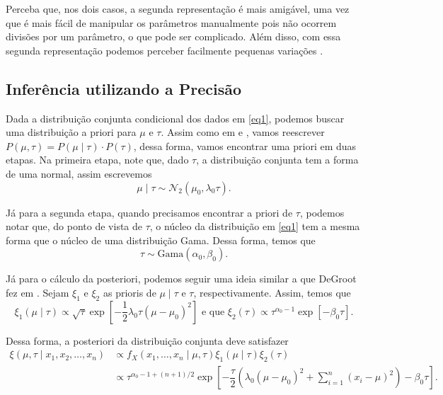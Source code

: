 \documentclass{article}
\begin{document}
Perceba que, nos dois casos, a segunda representação é mais amigável, uma vez que é mais fácil de manipular os parâmetros manualmente pois não ocorrem divisões por um parâmetro, o que pode ser complicado. Além disso, com essa segunda representação podemos perceber facilmente pequenas variações \cite{stackexchange}.

\subsection*{Inferência utilizando a Precisão}

Dada a distribuição conjunta condicional dos dados em \ref{eq1}, podemos buscar uma distribuição a priori para $\mu$ e $\tau$. Assim como em \cite{ehlers} e \cite{ehlers2}, vamos reescrever $P(\mu, \tau) = P(\mu \mid \tau)\cdot P(\tau)$, dessa forma, vamos encontrar uma priori em duas etapas. Na primeira etapa, note que, dado $\tau$, a distribuição conjunta tem a forma de uma normal, assim escrevemos
\[\mu \mid \tau \sim \mathcal{N}_2(\mu_0, \lambda_0 \tau).\]

Já para a segunda etapa, quando precisamos encontrar a priori de $\tau$, podemos notar que, do ponto de vista de $\tau$, o núcleo da distribuição em \ref{eq1} tem a mesma forma que o núcleo de uma distribuição Gama. Dessa forma, temos que
\[\tau \sim \text{Gama}\left(\alpha_0, \beta_0\right).\]

Já para o cálculo da posteriori, podemos seguir uma ideia similar a que DeGroot fez em \cite{degroot}. Sejam $\xi_1$ e $\xi_2$ as prioris de $\mu \mid \tau$ e $\tau$, respectivamente. Assim, temos que
\[\xi_1(\mu \mid \tau) \propto \sqrt{\tau} \exp{\left[-\dfrac{1}{2}\lambda_0 \tau (\mu - \mu_0)^2\right]} \text{ e que } \xi_2(\tau) \propto \tau^{\alpha_0 - 1} \exp{\left[- \beta_0 \tau\right]}.\]

Dessa forma, a posteriori da distribuição conjunta deve satisfazer
\begin{equation}
    \label{post1}
    \begin{split}
        \xi(\mu, \tau \mid x_1, x_2, \dots, x_n) & \propto f_X(x_1, \dots, x_n \mid \mu, \tau) \xi_1(\mu \mid \tau) \xi_2(\tau) \\
        & \propto \tau^{\alpha_0 - 1 + (n + 1)/2} \exp{\left[-\dfrac{\tau}{2}\left(\lambda_0 (\mu - \mu_0)^2 + \sum_{i = 1}^{n}\left(x_i - \mu\right)^2\right) - \beta_0 \tau\right]}.
    \end{split}
\end{equation}
\end{document}
